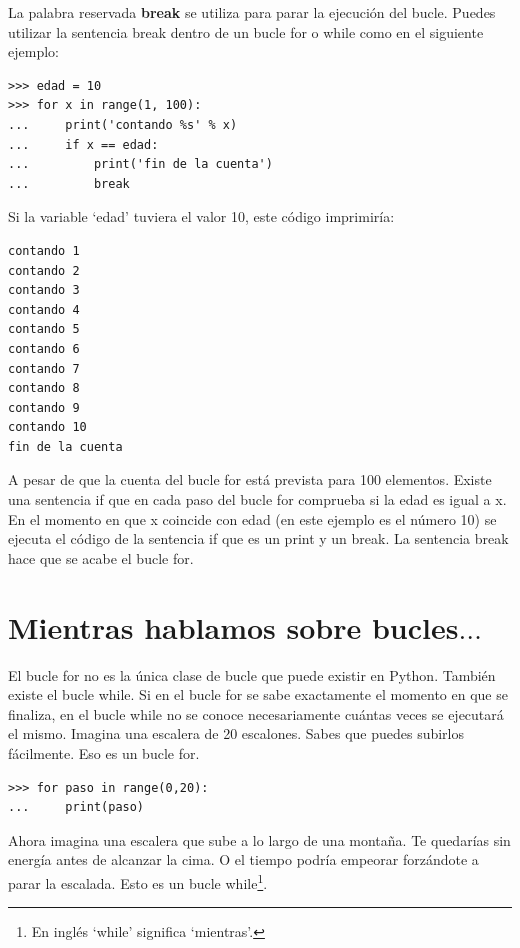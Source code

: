 La palabra reservada \textbf{break} se utiliza para parar la ejecución del bucle. Puedes utilizar la sentencia break dentro de un bucle for o while como en el siguiente ejemplo:

\begin{listing}
\begin{verbatim}
>>> edad = 10
>>> for x in range(1, 100):
...     print('contando %s' % x)
...     if x == edad:
...         print('fin de la cuenta')
...         break
\end{verbatim}
\end{listing}

Si la variable `edad' tuviera el valor 10, este código imprimiría:

\begin{listing}
\begin{verbatim}
contando 1
contando 2
contando 3
contando 4
contando 5
contando 6
contando 7
contando 8
contando 9
contando 10
fin de la cuenta
\end{verbatim}
\end{listing}

A pesar de que la cuenta del bucle for está prevista para 100 elementos. Existe una sentencia if que en cada paso del bucle for comprueba si la edad es igual a x. En el momento en que x coincide con edad (en este ejemplo es el número 10) se ejecuta el código de la sentencia if que es un print y un break. La sentencia break hace que se acabe el bucle for.


\section{Mientras hablamos sobre bucles$\ldots$}

El bucle for no es la única clase de bucle que puede existir en Python. También existe el bucle while. Si en el bucle for se sabe exactamente el momento en que se finaliza, en el bucle while no se conoce necesariamente cuántas veces se ejecutará el mismo. Imagina una escalera de 20 escalones.  Sabes que puedes subirlos fácilmente.  Eso es un bucle for.

\begin{listing}
\begin{verbatim}
>>> for paso in range(0,20):
...     print(paso)
\end{verbatim}
\end{listing}

Ahora imagina una escalera que sube a lo largo de una montaña.  Te quedarías sin energía antes de alcanzar la cima.  O el tiempo podría empeorar forzándote a parar la escalada.  Esto es un bucle while\footnote{En inglés `while' significa `mientras'.}.

